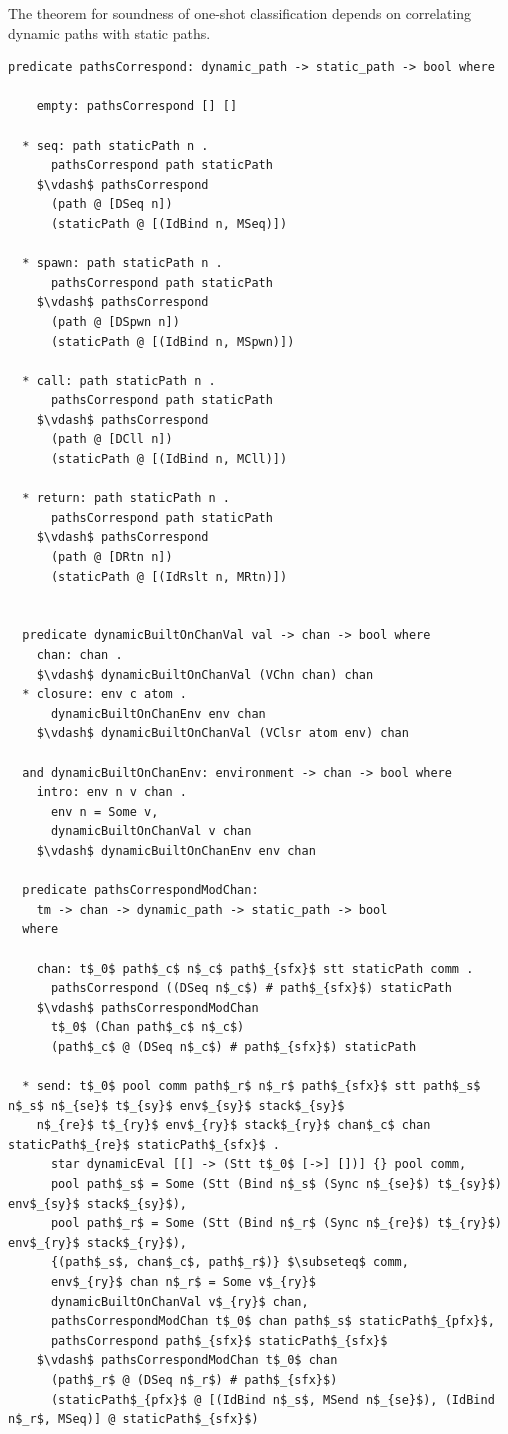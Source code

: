 \documentclass[letterpaper, 11pt]{report}
\begin{document}
The theorem for soundness of one-shot classification depends on
correlating dynamic paths with static paths.

\begin{lstlisting}[language=logic, mathescape]
  predicate pathsCorrespond: dynamic_path -> static_path -> bool where

    empty: pathsCorrespond [] []

  * seq: path staticPath n .
      pathsCorrespond path staticPath
    $\vdash$ pathsCorrespond
      (path @ [DSeq n])
      (staticPath @ [(IdBind n, MSeq)])

  * spawn: path staticPath n .
      pathsCorrespond path staticPath
    $\vdash$ pathsCorrespond
      (path @ [DSpwn n])
      (staticPath @ [(IdBind n, MSpwn)])

  * call: path staticPath n .
      pathsCorrespond path staticPath
    $\vdash$ pathsCorrespond
      (path @ [DCll n])
      (staticPath @ [(IdBind n, MCll)])

  * return: path staticPath n .
      pathsCorrespond path staticPath
    $\vdash$ pathsCorrespond
      (path @ [DRtn n])
      (staticPath @ [(IdRslt n, MRtn)])


  predicate dynamicBuiltOnChanVal val -> chan -> bool where
    chan: chan .
    $\vdash$ dynamicBuiltOnChanVal (VChn chan) chan
  * closure: env c atom .
      dynamicBuiltOnChanEnv env chan
    $\vdash$ dynamicBuiltOnChanVal (VClsr atom env) chan

  and dynamicBuiltOnChanEnv: environment -> chan -> bool where
    intro: env n v chan . 
      env n = Some v,
      dynamicBuiltOnChanVal v chan
    $\vdash$ dynamicBuiltOnChanEnv env chan

  predicate pathsCorrespondModChan:
    tm -> chan -> dynamic_path -> static_path -> bool
  where

    chan: t$_0$ path$_c$ n$_c$ path$_{sfx}$ stt staticPath comm .
      pathsCorrespond ((DSeq n$_c$) # path$_{sfx}$) staticPath
    $\vdash$ pathsCorrespondModChan
      t$_0$ (Chan path$_c$ n$_c$)
      (path$_c$ @ (DSeq n$_c$) # path$_{sfx}$) staticPath

  * send: t$_0$ pool comm path$_r$ n$_r$ path$_{sfx}$ stt path$_s$ n$_s$ n$_{se}$ t$_{sy}$ env$_{sy}$ stack$_{sy}$
    n$_{re}$ t$_{ry}$ env$_{ry}$ stack$_{ry}$ chan$_c$ chan staticPath$_{re}$ staticPath$_{sfx}$ . 
      star dynamicEval [[] -> (Stt t$_0$ [->] [])] {} pool comm,
      pool path$_s$ = Some (Stt (Bind n$_s$ (Sync n$_{se}$) t$_{sy}$) env$_{sy}$ stack$_{sy}$),
      pool path$_r$ = Some (Stt (Bind n$_r$ (Sync n$_{re}$) t$_{ry}$) env$_{ry}$ stack$_{ry}$),
      {(path$_s$, chan$_c$, path$_r$)} $\subseteq$ comm, 
      env$_{ry}$ chan n$_r$ = Some v$_{ry}$
      dynamicBuiltOnChanVal v$_{ry}$ chan, 
      pathsCorrespondModChan t$_0$ chan path$_s$ staticPath$_{pfx}$,
      pathsCorrespond path$_{sfx}$ staticPath$_{sfx}$
    $\vdash$ pathsCorrespondModChan t$_0$ chan
      (path$_r$ @ (DSeq n$_r$) # path$_{sfx}$)
      (staticPath$_{pfx}$ @ [(IdBind n$_s$, MSend n$_{se}$), (IdBind n$_r$, MSeq)] @ staticPath$_{sfx}$)
\end{lstlisting}
\end{document}
